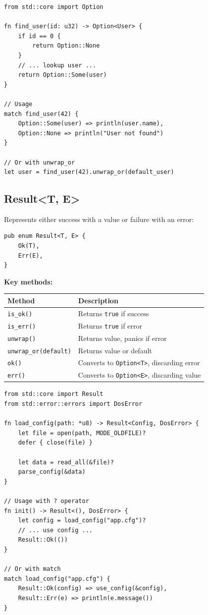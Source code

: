 \begin{lstlisting}
from std::core import Option

fn find_user(id: u32) -> Option<User> {
    if id == 0 {
        return Option::None
    }
    // ... lookup user ...
    return Option::Some(user)
}

// Usage
match find_user(42) {
    Option::Some(user) => println(user.name),
    Option::None => println("User not found")
}

// Or with unwrap_or
let user = find_user(42).unwrap_or(default_user)
\end{lstlisting}

\subsection{Result<T, E>}

Represents either success with a value or failure with an error:

\begin{lstlisting}
pub enum Result<T, E> {
    Ok(T),
    Err(E),
}
\end{lstlisting}

\textbf{Key methods:}

\begin{center}
\begin{tabular}{lp{8cm}}
\textbf{Method} & \textbf{Description} \\
\hline
\texttt{is\_ok()} & Returns \texttt{true} if success \\
\texttt{is\_err()} & Returns \texttt{true} if error \\
\texttt{unwrap()} & Returns value, panics if error \\
\texttt{unwrap\_or(default)} & Returns value or default \\
\texttt{ok()} & Converts to \texttt{Option<T>}, discarding error \\
\texttt{err()} & Converts to \texttt{Option<E>}, discarding value \\
\end{tabular}
\end{center}

\begin{lstlisting}
from std::core import Result
from std::error::errors import DosError

fn load_config(path: *u8) -> Result<Config, DosError> {
    let file = open(path, MODE_OLDFILE)?
    defer { close(file) }

    let data = read_all(&file)?
    parse_config(&data)
}

// Usage with ? operator
fn init() -> Result<(), DosError> {
    let config = load_config("app.cfg")?
    // ... use config ...
    Result::Ok(())
}

// Or with match
match load_config("app.cfg") {
    Result::Ok(config) => use_config(&config),
    Result::Err(e) => println(e.message())
}
\end{lstlisting}

